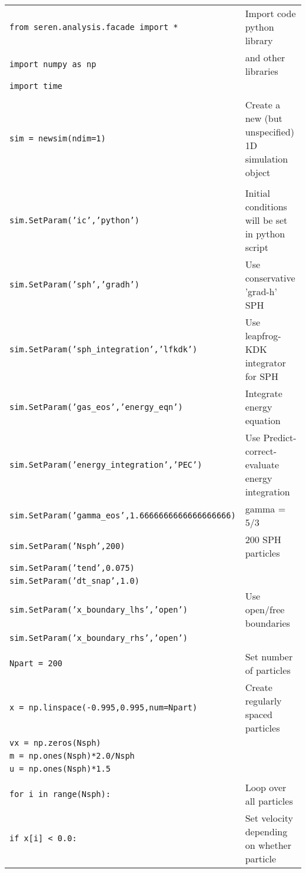 \documentclass[a4paper]{article}
\newcommand{\var}[1]{\texttt{#1}}
\begin{document}
\begin{tabular}{p{9cm}p{6.0cm}}
\var{from seren.analysis.facade import *}  & Import code python library \\
\var{import numpy as np}                   & and other libraries \\
\var{import time}                          & \\
& \\
\var{sim = newsim(ndim=1)}                 & Create a new (but unspecified) 1D simulation object \\
& \\                                       
\var{sim.SetParam('ic','python')}          & Initial conditions will be set in python script  \\
\var{sim.SetParam('sph','gradh')}          & Use conservative 'grad-h' SPH \\
\var{sim.SetParam('sph\_integration','lfkdk')} & Use leapfrog-KDK integrator for SPH \\
\var{sim.SetParam('gas\_eos','energy\_eqn')} & Integrate energy equation \\
\var{sim.SetParam('energy\_integration','PEC')} & Use Predict-correct-evaluate energy integration \\
\var{sim.SetParam('gamma\_eos',1.6666666666666666666)} & gamma = 5/3\\
\var{sim.SetParam('Nsph',200)} & 200 SPH particles \\
\var{sim.SetParam('tend',0.075)} & \\
\var{sim.SetParam('dt\_snap',1.0)} & \\
\var{sim.SetParam('x\_boundary\_lhs','open')} & Use open/free boundaries\\
\var{sim.SetParam('x\_boundary\_rhs','open')} & \\
& \\                      
\var{Npart = 200} &  Set number of particles \\
\var{x = np.linspace(-0.995,0.995,num=Npart)} & Create regularly spaced particles \\
\var{vx = np.zeros(Nsph)}  & \\
\var{m = np.ones(Nsph)*2.0/Nsph} & \\
\var{u = np.ones(Nsph)*1.5} & \\
& \\          
\var{for i in range(Nsph):}   & Loop over all particles \\
\hspace{0.5cm}\var{if x[i] < 0.0:}   & Set velocity depending on whether particle \\

\end{tabular}
\end{document}
